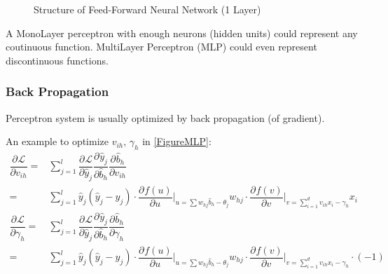 \begin{figure}[H]
\begin{tikzpicture}[shorten >=1pt,->,draw=black!50, node distance=\layersep]


\end{tikzpicture}

\caption{Structure of Feed-Forward Neural Network (1 Layer)}
\label{FigureMLP}
\end{figure}
    
    
    A MonoLayer perceptron with enough neurons (hidden units) could represent any coutinuous function. MultiLayer Perceptron (MLP) could even represent discontinuous functions. 
    
\subsubsection{Back Propagation}
    Perceptron system is usually optimized by back propagation (of gradient).

    An example to optimize $ v_{ih},\,\gamma _h $ in \autoref{FigureMLP}:
    \begin{align}
        \dfrac{\partial^{} \mathcal{L}}{\partial v_{ih}}=&\sum_{j=1}^l\dfrac{\partial^{} \mathcal{L}}{\partial \hat{y}_j^{}}\dfrac{\partial^{} \hat{y}_j}{\partial \hat{b}_h^{}}\dfrac{\partial^{} \hat{b}_h}{\partial v_{ih}}\\
        =&\sum_{j=1}^l\hat{y}_j(\hat{y}_j-y_j)\cdot \dfrac{\partial^{} f(u)}{\partial u^{}}\Big|_{u=\sum w_{hj}\hat{b}_h-\theta _j}w_{hj}\cdot \dfrac{\partial^{} f(v)}{\partial v^{}}\Big|_{v=\sum_{i=1}^dv_{ih}x_i-\gamma _h}x_i\\
        \dfrac{\partial^{} \mathcal{L}}{\partial \gamma _h}=&\sum_{j=1}^l\dfrac{\partial^{} \mathcal{L}}{\partial \hat{y}_j^{}}\dfrac{\partial^{} \hat{y}_j}{\partial \hat{b}_h^{}}\dfrac{\partial^{} \hat{b}_h}{\partial \gamma _h}\\
        =&\sum_{j=1}^l\hat{y}_j(\hat{y}_j-y_j)\cdot \dfrac{\partial^{} f(u)}{\partial u^{}}\Big|_{u=\sum w_{hj}\hat{b}_h-\theta _j}w_{hj}\cdot \dfrac{\partial^{} f(v)}{\partial v^{}}\Big|_{v=\sum_{i=1}^dv_{ih}x_i-\gamma _h}\cdot (-1)
    \end{align}
    
    

